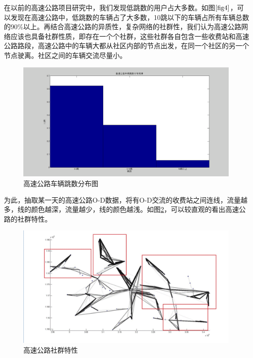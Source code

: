 				在以前的高速公路项目研究中，我们发现低跳数的用户占大多数。如图$\ref{fig4}$，可以发现在高速公路中，低跳数的车辆占了大多数，10跳以下的车辆占所有车辆总数的90\%以上。再结合高速公路的异质性，复杂网络的社群性，我们认为高速公路网络应该也具备社群性质，即存在一个个社群，这些社群各自包含一些收费站和高速公路路段，高速公路中的车辆大都从社区内部的节点出发，在同一个社区的另一个节点驶离。社区之间的车辆交流尽量小。

				\begin{figure}[h]
				\centering
						\begin{minipage}{0.8\linewidth}
							\centering
							\includegraphics[width=4.4in]{picture/tiaoshu}
							\caption{高速公路车辆跳数分布图}
							\label{fig4}
						\end{minipage}%
				\end{figure}

				为此，抽取某一天的高速公路O-D数据，将有O-D交流的收费站之间连线，流量越多，线的颜色越深，流量越少，线的颜色越浅。如图\ref{fig5}，可以较直观的看出高速公路的社群特性。

				\begin{figure}[h]
				\centering
						\begin{minipage}{0.8\linewidth}
							\centering
							\includegraphics[width=4.4in]{picture/shequntexing}
							\caption{高速公路社群特性}
							\label{fig5}
						\end{minipage}%
				\end{figure}

